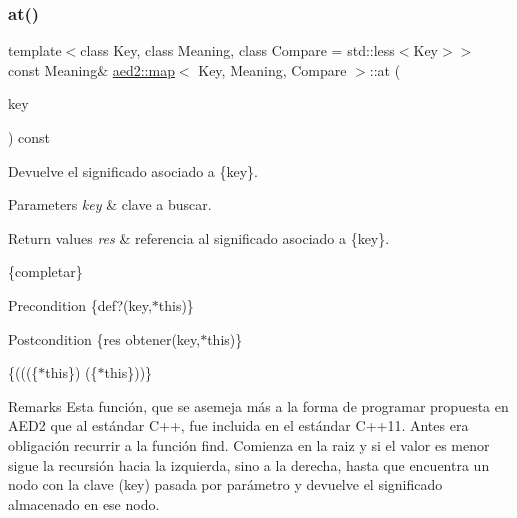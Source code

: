 \subsubsection{\texorpdfstring{at()}{at()}\hspace{0.1cm}{\footnotesize\ttfamily [1/4]}}
{\footnotesize\ttfamily template$<$class Key, class Meaning, class Compare = std\+::less$<$\+Key$>$$>$ \\
const Meaning\& \hyperlink{classaed2_1_1map}{aed2\+::map}$<$ Key, Meaning, Compare $>$\+::at (\begin{DoxyParamCaption}\item[{const Key \&}]{key }\end{DoxyParamCaption}) const\hspace{0.3cm}{\ttfamily [inline]}}



Devuelve el significado asociado a \{key\}. 


\begin{DoxyParams}{Parameters}
{\em key} & clave a buscar. \\
\hline
\end{DoxyParams}

\begin{DoxyRetVals}{Return values}
{\em res} & referencia al significado asociado a \{key\}.\\
\hline
\end{DoxyRetVals}
\{completar\}

\begin{DoxyPrecond}{Precondition}
\{def?(key,$\ast$this)\}
\end{DoxyPrecond}
\begin{DoxyPostcond}{Postcondition}
\{res  obtener(key,$\ast$this)\}
\end{DoxyPostcond}
\{(((\{$\ast$this\})  (\{$\ast$this\}))\}

\begin{DoxyRemark}{Remarks}
Esta función, que se asemeja más a la forma de programar propuesta en A\+E\+D2 que al estándar C++, fue incluida en el estándar C++11. Antes era obligación recurrir a la función find. Comienza en la raiz y si el valor es menor sigue la recursión hacia la izquierda, sino a la derecha, hasta que encuentra un nodo con la clave (key) pasada por parámetro y devuelve el significado almacenado en ese nodo. 
\end{DoxyRemark}
\mbox{\label{classaed2_1_1map_a579c9179b42175c23a1013ac7f1b876c}} 
